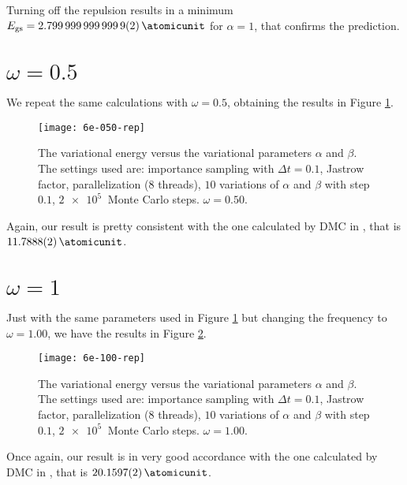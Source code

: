Turning off the repulsion results in a minimum $E_{\text{gs}} = \SI{2.7999999999999 \pm 0.0000000000002}{\atomicunit}$ for $\alpha=1$, that confirms the prediction.

\section{$\omega = 0.5$}
We repeat the same calculations with $\omega=0.5$, obtaining the results in Figure \ref{fig:6e-050-rep}.
\begin{figure}[H]
	\centering
	\texttt{[image: 6e-050-rep]}
	\caption{The variational energy versus the variational parameters $\alpha$ and $\beta$. The settings used are: importance sampling with $\Delta t = 0.1$, Jastrow factor, parallelization (8 threads), $10$ variations of $\alpha$ and $\beta$ with step $0.1$, $\SI{2e5}{}$ Monte Carlo steps. $\omega=0.50$.}
	\label{fig:6e-050-rep}
\end{figure}

Again, our result is pretty consistent with the one calculated by DMC in \cite{PedersenLohne2011}, that is $\SI{11.7888 \pm 0.0002}{\atomicunit}$.

\section{$\omega = 1$}

Just with the same parameters used in Figure \ref{fig:6e-050-rep} but changing the frequency to $\omega=1.00$, we have the results in Figure \ref{fig:6e-100-rep}.
\begin{figure}[H]
	\centering
	\texttt{[image: 6e-100-rep]}
	\caption{The variational energy versus the variational parameters $\alpha$ and $\beta$. The settings used are: importance sampling with $\Delta t = 0.1$, Jastrow factor, parallelization (8 threads), $10$ variations of $\alpha$ and $\beta$ with step $0.1$, $\SI{2e5}{}$ Monte Carlo steps. $\omega=1.00$.}
	\label{fig:6e-100-rep}
\end{figure}

Once again, our result is in very good accordance with the one calculated by DMC in \cite{PedersenLohne2011}, that is $\SI{20.1597 \pm 0.0002}{\atomicunit}$.